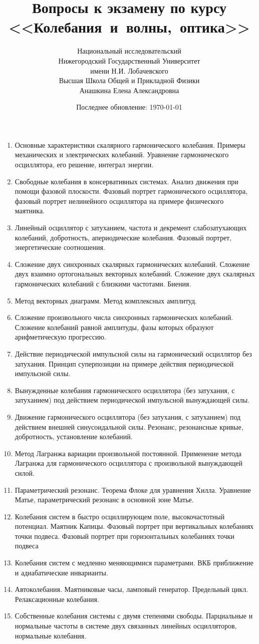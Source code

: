 \documentclass{article}
\title{Вопросы к экзамену по курсу \mbox{<<Колебания и волны, оптика>>}}
\date{Последнее обновление: \today}
\author{Национальный исследовательский \\
Нижегородский Государственный Университет \\
имени Н.И. Лобачевского \vspace{0.5em} \\
Высшая Школа Общей и Прикладной Физики \vspace{0.5em} \\
Анашкина Елена Александровна \vspace{0.5em}}
\newcounter{ticket}[subsection]
\newcounter{Ticket}[subsection]
\newcommand{\Ticket}[1][]{\item[Билет \ifthenelse{\equal{#1}{}}{}{\setcounter{ticket}{#1}}\theticket\refstepcounter{ticket}:]}
\begin{document}
\maketitle
\begin{enumerate}
    \Ticket[1] Основные характеристики скалярного гармонического колебания. Примеры механических и электрических колебаний. Уравнение гармонического осциллятора, его решение, интеграл энергии.
    \Ticket Свободные колебания в консервативных системах. Анализ движения при помощи фазовой плоскости. Фазовый портрет гармонического осциллятора, фазовый портрет нелинейного осциллятора на примере физического маятника. 
    \Ticket Линейный осциллятор с затуханием, частота и декремент слабозатухающих колебаний, добротность, апериодические колебания. Фазовый портрет, энергетические соотношения. 
    \Ticket Сложение двух синхронных скалярных гармонических колебаний. Сложение двух взаимно ортогональных векторных колебаний. Сложение двух скалярных гармонических колебаний с близкими частотами. Биения.
    \Ticket Метод векторных диаграмм. Метод комплексных амплитуд. 
    \Ticket Сложение произвольного числа синхронных гармонических колебаний. Сложение колебаний равной амплитуды, фазы которых образуют арифметическую прогрессию.
    \Ticket Действие периодической импульсной силы на гармонический осциллятор без затухания. Принцип суперпозиции на примере действия периодической импульсной силы.
    \Ticket Вынужденные колебания гармонического осциллятора (без затухания, с затуханием) под действием периодической импульсной вынуждающей силы.
    \Ticket Движение гармонического осциллятора (без затухания, с затуханием) под действием внешней синусоидальной силы. Резонанс, резонансные кривые, добротность, установление колебаний.
    \Ticket Метод Лагранжа вариации произвольной постоянной. Применение метода Лагранжа для гармонического осциллятора с произвольной вынуждающей силой.
    \Ticket Параметрический резонанс. Теорема Флоке для уравнения Хилла. Уравнение Матье, параметрический резонанс в основной зоне Матье. 
    \Ticket Колебания систем в быстро осциллирующем поле, высокочастотный потенциал. Маятник Капицы. Фазовый портрет при вертикальных колебаниях точки подвеса. Фазовый портрет при горизонтальных колебаниях точки подвеса 
    \Ticket Колебания систем с медленно меняющимися параметрами. ВКБ приближение и адиабатические инварианты.
    \Ticket Автоколебания. Маятниковые часы, ламповый генератор. Предельный цикл. Релаксационные колебания.
    \Ticket Собственные колебания системы с двумя степенями свободы. Парциальные и нормальные частоты в системе двух связанных линейных осцилляторов, нормальные колебания. 

\end{enumerate}
\end{document}
